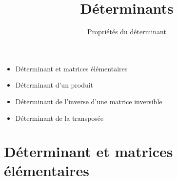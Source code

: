 

   





\title{{\bf Déterminants}}
\subtitle{Propriétés du déterminant}

\begin{frame}
  
  \debutmontitre

  \pause

{\footnotesize
\hfill
{}
\begin{minipage}{0.6\textwidth}
  \begin{itemize}
    \item<3-> Déterminant et matrices élémentaires
    \item<4-> Déterminant d'un produit
    \item<5-> Déterminant de l'inverse d'une matrice inversible
    \item<6-> Déterminant de la transposée
  \end{itemize}
\end{minipage}
}

\end{frame}

\setcounter{framenumber}{0}


\section{Déterminant et matrices élémentaires}

